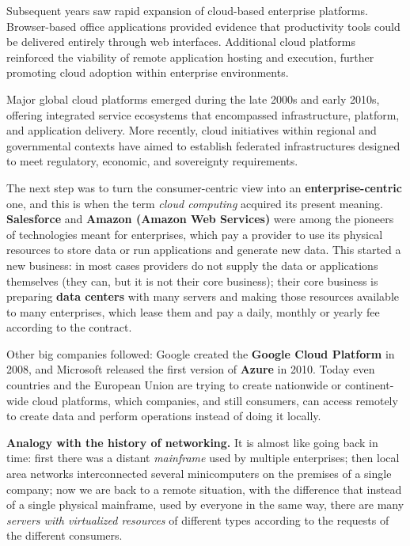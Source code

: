 \documentclass[11pt,a4paper,openany]{report}
\begin{document}
Subsequent years saw rapid expansion of cloud-based enterprise platforms. Browser-based office applications provided evidence that productivity tools could be delivered entirely through web interfaces. Additional cloud platforms reinforced the viability of remote application hosting and execution, further promoting cloud adoption within enterprise environments.

Major global cloud platforms emerged during the late 2000s and early 2010s, offering integrated service ecosystems that encompassed infrastructure, platform, and application delivery. More recently, cloud initiatives within regional and governmental contexts have aimed to establish federated infrastructures designed to meet regulatory, economic, and sovereignty requirements.

The next step was to turn the consumer-centric view into an \textbf{enterprise-centric} one, and this is when the term \emph{cloud computing} acquired its present meaning. \textbf{Salesforce} and \textbf{Amazon (Amazon Web Services)} were among the pioneers of technologies meant for enterprises, which pay a provider to use its physical resources to store data or run applications and generate new data. This started a new business: in most cases providers do not supply the data or applications themselves (they can, but it is not their core business); their core business is preparing \textbf{data centers} with many servers and making those resources available to many enterprises, which lease them and pay a daily, monthly or yearly fee according to the contract.

Other big companies followed: Google created the \textbf{Google Cloud Platform} in 2008, and Microsoft released the first version of \textbf{Azure} in 2010. Today even countries and the European Union are trying to create nationwide or continent-wide cloud platforms, which companies, and still consumers, can access remotely to create data and perform operations instead of doing it locally.

\begin{notebox}
	\textbf{Analogy with the history of networking.} It is almost like going back in time: first there was a distant \emph{mainframe} used by multiple enterprises; then local area networks interconnected several minicomputers on the premises of a single company; now we are back to a remote situation, with the difference that instead of a single physical mainframe, used by everyone in the same way, there are many \emph{servers with virtualized resources} of different types according to the requests of the different consumers.
\end{notebox} 
\end{document}
